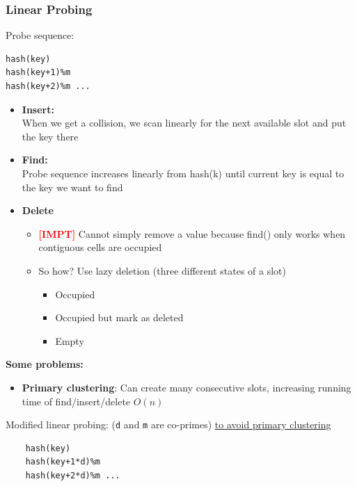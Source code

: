 \documentclass{article}
\newcommand{\impt}[0]{\textcolor{red}{\textbf{[IMPT] }}}
\begin{document}
\begin{multicols}{2}
\subsubsection{Linear Probing}
Probe sequence:
\begin{lstlisting}
hash(key)
hash(key+1)%m
hash(key+2)%m ...
\end{lstlisting}
\begin{itemize}
	\item \textbf{Insert:}\\
	When we get a collision, we scan linearly for the next available slot and put the key there
	\item \textbf{Find:}\\
	Probe sequence increases linearly from hash(k) until current key is equal to the key we want to find
	\item \textbf{Delete}
	\begin{itemize}
		\item \impt Cannot simply remove a value because find() only works when contiguous cells are occupied
		\item So how? Use lazy deletion (three different states of a slot)
		\begin{itemize}
			\item Occupied
			\item Occupied but mark as deleted
			\item Empty
		\end{itemize}
	\end{itemize}
\end{itemize}
\textbf{Some problems:}
\begin{itemize}
	\item \textbf{Primary clustering}: Can create many consecutive slots, increasing running time of find/insert/delete $O(n)$
\end{itemize}
Modified linear probing: (\texttt{d} and \texttt{m} are co-primes) \underline{to avoid primary clustering}
\begin{lstlisting}
	hash(key)
	hash(key+1*d)%m
	hash(key+2*d)%m ...
\end{lstlisting}


\end{multicols}
\end{document}
